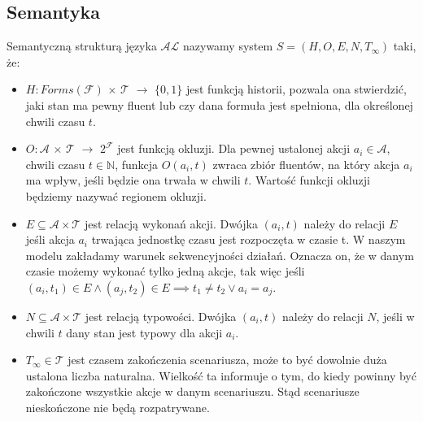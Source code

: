 \subsection{Semantyka}
\begin{definition}
Semantyczną strukturą języka $\mathcal{AL}$ nazywamy system $ S=(H,O,E,N,T_{\infty }) $ taki, że:
	\begin{itemize}
		\item $ H: Forms(\mathcal{F}) $ $\times$ $ \mathcal{T}$ $\longrightarrow$ $\{0,1\}$ jest funkcją historii, pozwala ona stwierdzić, jaki stan ma pewny fluent lub czy dana formuła jest spełniona, dla określonej chwili czasu $t$.
		\item $ O: \mathcal{A}$ $\times$ $ \mathcal{T}$ $\longrightarrow$ $2^{\mathcal{F}}$ jest funkcją okluzji. Dla pewnej ustalonej akcji $a_i \in \mathcal{A}$, chwili czasu $t\in\mathbb{N}$, funkcja $O(a_i,t) $ zwraca zbiór fluentów, na który akcja $a_i$ ma wpływ, jeśli będzie ona trwała w chwili $t$. 
Wartość funkcji okluzji będziemy nazywać regionem okluzji. 
		\item $E\subseteq \mathcal{A} \times \mathcal{T}$ jest relacją wykonań akcji. Dwójka $(a_i,t)$ należy do relacji $E$ jeśli akcja $a_i$ trwająca jednostkę czasu jest rozpoczęta w czasie t. W naszym modelu zakładamy warunek sekwencyjności działań. Oznacza on, że w danym czasie możemy wykonać tylko jedną akcje, tak więc jeśli $(a_i, t_1) \in E \land (a_j, t_2) \in E \implies t_1 \neq t_2 \lor a_i = a_j$.
		\item $N\subseteq \mathcal{A} \times \mathcal{T}$ jest relacją typowości. 
		Dwójka $(a_i,t)$ należy do relacji $N$, jeśli w chwili $t$ dany stan jest typowy dla akcji $a_i$. 
		\item $T_{\infty } \in \mathcal{T} $ jest czasem zakończenia scenariusza, może to być dowolnie duża ustalona liczba naturalna. 
		Wielkość ta informuje o tym, do kiedy powinny być zakończone wszystkie akcje w danym scenariuszu. Stąd scenariusze nieskończone nie będą rozpatrywane. 
	\end{itemize}
\end{definition}

